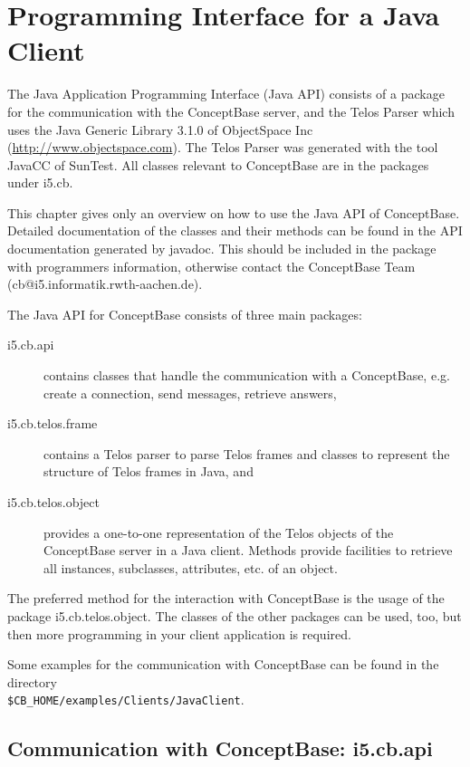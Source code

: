 
\chapter{Programming Interface for a Java Client}

The Java Application Programming Interface (Java API) consists
of a package for the communication with the ConceptBase server,
and the Telos Parser which uses the Java Generic Library 3.1.0
of ObjectSpace Inc (\url{http://www.objectspace.com}). The Telos Parser was generated with the tool
JavaCC of SunTest. All classes relevant to ConceptBase are
in the packages under i5.cb.

This chapter gives only an overview on how to use the Java API
of ConceptBase. Detailed documentation of the classes and
their methods can be found in the API documentation generated
by javadoc. This should be included in the package with
programmers information, otherwise contact the ConceptBase
Team (cb@i5.informatik.rwth-aachen.de).

The Java API for ConceptBase consists of three main packages:
\begin{description}
\item[i5.cb.api] contains classes that handle the communication
with a ConceptBase, e.g. create a connection, send messages,
retrieve answers,
\item[i5.cb.telos.frame] contains a Telos parser to parse
Telos frames and classes to represent the structure of
Telos frames in Java, and
\item[i5.cb.telos.object] provides a one-to-one representation
of the Telos objects of the ConceptBase server in a Java client.
Methods provide facilities to retrieve all instances, subclasses,
attributes, etc. of an object.
\end{description}

The preferred method for the interaction with ConceptBase is the
usage of the package i5.cb.telos.object. The classes of the
other packages can be used, too, but then more programming
in your client application is required.

Some examples for the communication with ConceptBase
can be found in the directory \\\verb+$CB_HOME/examples/Clients/JavaClient+.

\section{Communication with ConceptBase: i5.cb.api}

